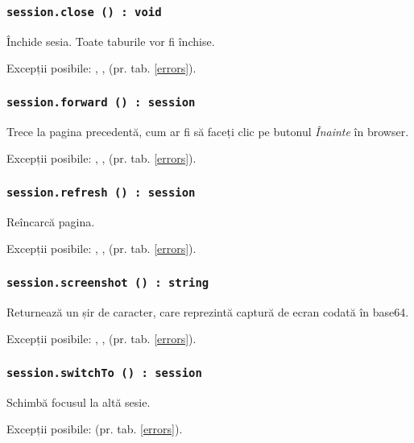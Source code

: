 \subsubsection{\texttt{session.close () : void}}

Închide sesia. Toate taburile vor fi închise.

Excepții posibile: , ,  (pr. tab. \ref{errors}).

\subsubsection{\texttt{session.forward () : session}}

Trece la pagina precedentă, cum ar fi să faceți clic pe butonul \textit{Înainte} în browser.

Excepții posibile: , ,  (pr. tab. \ref{errors}).

\subsubsection{\texttt{session.refresh () : session}}

Reîncarcă pagina.

Excepții posibile: , ,  (pr. tab. \ref{errors}).

\subsubsection{\texttt{session.screenshot () : string}}

Returnează un șir de caracter, care reprezintă captură de ecran codată în base64.

Excepții posibile: , ,  (pr. tab. \ref{errors}).

\subsubsection{\texttt{session.switchTo () : session}}

Schimbă focusul la altă sesie.

Excepții posibile:  (pr. tab. \ref{errors}).


